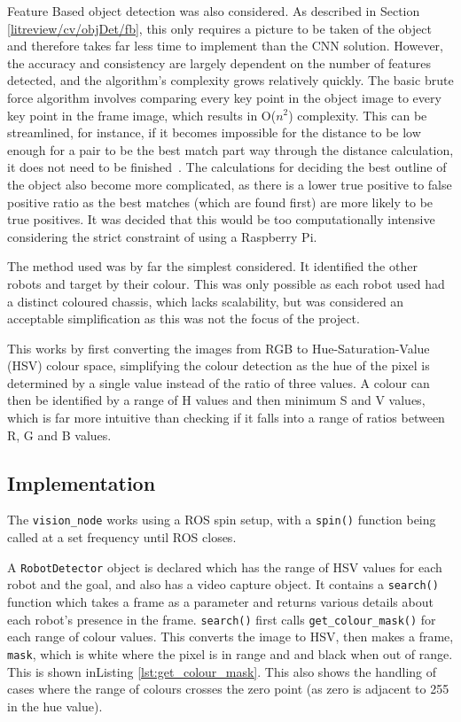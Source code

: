 Feature Based object detection was also considered. As described in
Section \ref{litreview/cv/objDet/fb}, this only requires a picture to be
taken of the object and therefore takes far less time to
implement than the CNN solution. However, the accuracy and
consistency are largely dependent on the number of features
detected, and the algorithm's complexity grows relatively
quickly. The basic brute force algorithm involves comparing
every key point in the object image to every key point in the
frame image, which results in O($n^2$) complexity. This can be streamlined, for instance, if it becomes impossible
for the distance to be low enough for a pair to be the best
match part way through the distance calculation, it does not
need to be finished~\cite{opencv_library}. The calculations for deciding the best
outline of the object also become more complicated, as there
is a lower true positive to false positive ratio as the
best matches (which are found first) are more likely to be
true positives. It was decided that this would be too
computationally intensive considering the strict constraint of
using a Raspberry Pi.

The method used was by far the simplest considered. It identified the other robots and target
by their colour. This was only possible as each robot used had a distinct coloured chassis,
which lacks scalability, but was considered an acceptable simplification as this was not the
focus of the project.

This works by first converting the images from RGB to Hue-Saturation-Value (HSV) colour space,
simplifying the colour detection as the hue of the pixel is determined by a single value
instead of the ratio of three values. A colour can then be identified by a range of H values
and then minimum S and V values, which is far more intuitive than checking if it falls into a
range of ratios between R, G and B values.

\subsection{Implementation}\label{soft/cv/impl}
The \verb|vision_node| works using a ROS spin setup, with a \verb|spin()| function being
called at a set frequency until ROS closes.

A \verb|RobotDetector| object is declared which has the range of HSV values for each robot
and the goal, and also has a video capture object. It contains a \verb|search()| function which
takes a frame as a parameter and returns various details about each robot's presence in the
frame. \verb|search()| first calls \verb|get_colour_mask()| for each range of colour
values. This converts the image to HSV, then makes a frame, \verb|mask|, which is white where
the pixel is in range and and black when out of range. This is shown inListing
\ref{lst:get_colour_mask}. This also shows the handling of cases where the range of colours
crosses the zero point (as zero is adjacent to 255 in the hue value).

